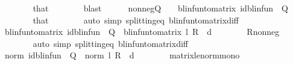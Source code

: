 \begin{isabellebody}
\ \ \ \ \ \ \isamarkupfalse%
\ that\isanewline
\ \ \ \ \ \ \isamarkupfalse%
\ blast\isanewline
\ \ \ \ \isamarkupfalse%
\ nonneg{\isacharunderscore}{\kern0pt}Q{\isacharcolon}{\kern0pt}\ \ {\isachardoublequoteopen}{}\ {\isasymle}\ blinfun{\isacharunderscore}{\kern0pt}to{\isacharunderscore}{\kern0pt}matrix\ {\isacharparenleft}{\kern0pt}id{\isacharunderscore}{\kern0pt}blinfun\ {\isacharminus}{\kern0pt}\ Q{\isacharparenright}{\kern0pt}{\isachardoublequoteclose}\isanewline
\ \ \ \ \ \ \isamarkupfalse%
\ that\isanewline
\ \ \ \ \ \ \isamarkupfalse%
\ {\isacharparenleft}{\kern0pt}auto\ simp{\isacharcolon}{\kern0pt}\ splitting{\isacharunderscore}{\kern0pt}eq\ blinfun{\isacharunderscore}{\kern0pt}to{\isacharunderscore}{\kern0pt}matrix{\isacharunderscore}{\kern0pt}diff{\isacharparenright}{\kern0pt}\isanewline
\ \ \ \ \isamarkupfalse%
\ \isamarkupfalse%
\ {\isachardoublequoteopen}{\isacharparenleft}{\kern0pt}blinfun{\isacharunderscore}{\kern0pt}to{\isacharunderscore}{\kern0pt}matrix\ {\isacharparenleft}{\kern0pt}id{\isacharunderscore}{\kern0pt}blinfun\ {\isacharminus}{\kern0pt}\ Q{\isacharparenright}{\kern0pt}{\isacharparenright}{\kern0pt}\ {\isasymle}\ {\isacharparenleft}{\kern0pt}blinfun{\isacharunderscore}{\kern0pt}to{\isacharunderscore}{\kern0pt}matrix\ {\isacharparenleft}{\kern0pt}l\ {\isacharasterisk}{\kern0pt}\isactrlsub R\ {\isasymP}\ d{\isacharparenright}{\kern0pt}{\isacharparenright}{\kern0pt}{\isachardoublequoteclose}\isanewline
\ \ \ \ \ \ \isamarkupfalse%
\ R{\isacharunderscore}{\kern0pt}nonneg\isanewline
\ \ \ \ \ \ \isamarkupfalse%
\ {\isacharparenleft}{\kern0pt}auto\ simp{\isacharcolon}{\kern0pt}\ splitting{\isacharunderscore}{\kern0pt}eq\ blinfun{\isacharunderscore}{\kern0pt}to{\isacharunderscore}{\kern0pt}matrix{\isacharunderscore}{\kern0pt}diff{\isacharparenright}{\kern0pt}\isanewline
\ \ \ \ \isamarkupfalse%
\ \isamarkupfalse%
\ {\isachardoublequoteopen}norm\ {\isacharparenleft}{\kern0pt}id{\isacharunderscore}{\kern0pt}blinfun\ {\isacharminus}{\kern0pt}\ Q{\isacharparenright}{\kern0pt}\ {\isasymle}\ norm\ {\isacharparenleft}{\kern0pt}l\ {\isacharasterisk}{\kern0pt}\isactrlsub R\ {\isasymP}\ d{\isacharparenright}{\kern0pt}{\isachardoublequoteclose}\isanewline
\ \ \ \ \ \ \isamarkupfalse%
\ matrix{\isacharunderscore}{\kern0pt}le{\isacharunderscore}{\kern0pt}norm{\isacharunderscore}{\kern0pt}mono\ \isamarkupfalse%

\end{isabellebody}
